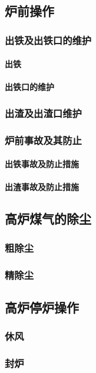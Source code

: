 \documentclass[UTF8]{../../ApplicationUniverse}
\begin{document}
    \subsection{炉前操作}
        \subsubsection{出铁及出铁口的维护}
            \paragraph{出铁}
            \paragraph{出铁口的维护}
        \subsubsection{出渣及出渣口维护}
        \subsubsection{炉前事故及其防止}
            \paragraph{出铁事故及防止措施}
            \paragraph{出渣事故及防止措施}
    \subsection{高炉煤气的除尘}
        \subsubsection{粗除尘}
        \subsubsection{精除尘}
    \subsection{高炉停炉操作}
        \subsubsection{休风}
        \subsubsection{封炉}
\end{document}
